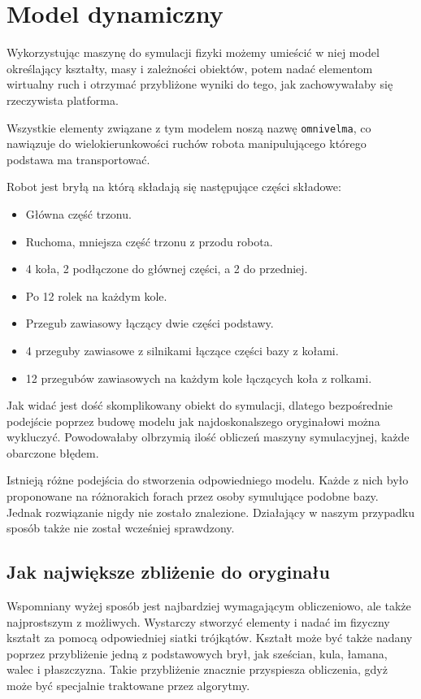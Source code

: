 \section{Model dynamiczny}
	\label{sec:omnivelma}
	Wykorzystując maszynę do symulacji fizyki możemy umieścić w niej model określający kształty, masy i zależności obiektów, potem nadać elementom wirtualny ruch i otrzymać przybliżone wyniki do tego, jak zachowywałaby się rzeczywista platforma.

	Wszystkie elementy związane z tym modelem noszą nazwę \texttt{omnivelma}, co nawiązuje do wielokierunkowości ruchów robota manipulującego którego podstawa ma transportować.

	Robot jest bryłą na którą składają się następujące części składowe:
	\begin{itemize}
	\item Główna część trzonu.
	\item Ruchoma, mniejsza część trzonu z przodu robota.
	\item 4 koła, 2 podłączone do głównej części, a 2 do przedniej.
	\item Po 12 rolek na każdym kole.
	\item Przegub zawiasowy łączący dwie części podstawy.
	\item 4 przeguby zawiasowe z silnikami łączące części bazy z kołami.
	\item 12 przegubów zawiasowych na każdym kole łączących koła z rolkami.
	\end{itemize}

	Jak widać jest dość skomplikowany obiekt do symulacji, dlatego bezpośrednie podejście poprzez budowę modelu jak najdoskonalszego oryginałowi można wykluczyć.
	Powodowałaby olbrzymią ilość obliczeń maszyny symulacyjnej, każde obarczone błędem.

	Istnieją różne podejścia do stworzenia odpowiedniego modelu. Każde z nich było proponowane na różnorakich forach przez osoby symulujące podobne bazy.
	Jednak rozwiązanie nigdy nie zostało znalezione.
	Działający w naszym przypadku sposób także nie został wcześniej sprawdzony.

	\subsection{Jak największe zbliżenie do oryginału}
		Wspomniany wyżej sposób jest najbardziej wymagającym obliczeniowo, ale także najprostszym z możliwych.
		Wystarczy stworzyć elementy i nadać im fizyczny kształt za pomocą odpowiedniej siatki trójkątów.
		Kształt może być także nadany poprzez przybliżenie jedną z podstawowych brył, jak sześcian, kula, łamana, walec i płaszczyzna.
		Takie przybliżenie znacznie przyspiesza obliczenia, gdyż może być specjalnie traktowane przez algorytmy.

